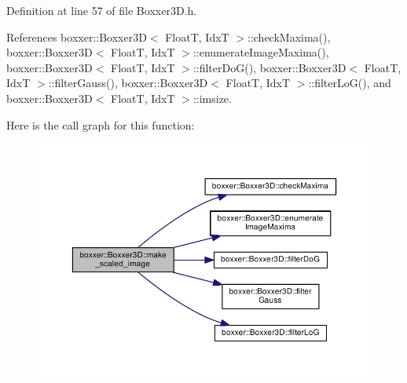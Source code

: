 Definition at line 57 of file Boxxer3\+D.\+h.



References boxxer\+::\+Boxxer3\+D$<$ Float\+T, Idx\+T $>$\+::check\+Maxima(), boxxer\+::\+Boxxer3\+D$<$ Float\+T, Idx\+T $>$\+::enumerate\+Image\+Maxima(), boxxer\+::\+Boxxer3\+D$<$ Float\+T, Idx\+T $>$\+::filter\+Do\+G(), boxxer\+::\+Boxxer3\+D$<$ Float\+T, Idx\+T $>$\+::filter\+Gauss(), boxxer\+::\+Boxxer3\+D$<$ Float\+T, Idx\+T $>$\+::filter\+Lo\+G(), and boxxer\+::\+Boxxer3\+D$<$ Float\+T, Idx\+T $>$\+::imsize.



Here is the call graph for this function\+:\nopagebreak
\begin{figure}[H]
\begin{center}
\leavevmode
\includegraphics[width=350pt]{classboxxer_1_1Boxxer3D_a3bc9609e6bdb4a6aac10aea313b70b12_cgraph}
\end{center}
\end{figure}


